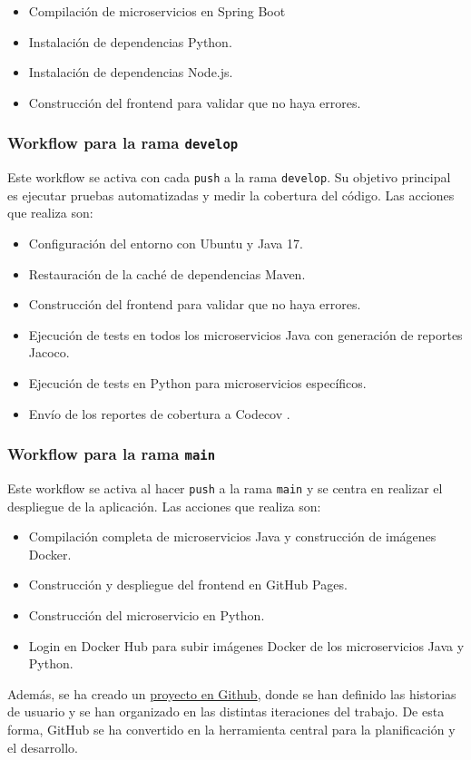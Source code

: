 \begin{itemize}
  \item Compilación de microservicios en Spring Boot
  \item Instalación de dependencias Python.
  \item Instalación de dependencias Node.js.
  \item Construcción del frontend para validar que no haya errores.
\end{itemize}
\subsubsection*{Workflow para la rama \texttt{develop}}

Este workflow se activa con cada \texttt{push} a la rama \texttt{develop}. Su objetivo principal es ejecutar pruebas automatizadas y medir la cobertura del código. Las acciones que realiza son: 

\begin{itemize}
  \item Configuración del entorno con Ubuntu y Java 17.
  \item Restauración de la caché de dependencias Maven.
  \item Construcción del frontend para validar que no haya errores.
  \item Ejecución de tests en todos los microservicios Java con generación de reportes Jacoco.
  \item Ejecución de tests en Python para microservicios específicos.
  \item Envío de los reportes de cobertura a Codecov \cite{codecov}.
\end{itemize}



\subsubsection*{Workflow para la rama \texttt{main}}

Este workflow se activa al hacer \texttt{push} a la rama \texttt{main} y se centra en realizar el despliegue de la aplicación. Las acciones que realiza son: 

\begin{itemize}
  \item Compilación completa de microservicios Java y construcción de imágenes Docker.
  \item Construcción y despliegue del frontend en GitHub Pages.
  \item Construcción del microservicio en Python.
  \item Login en Docker Hub para subir imágenes Docker de los microservicios Java y Python.
\end{itemize}
\vspace{0.5em}
Además, se ha creado un \href{https://github.com/users/alonsodm12/projects/5}{proyecto en Github}, donde se han definido las historias de usuario y se han organizado en las distintas iteraciones del trabajo. De esta forma, GitHub se ha convertido en la herramienta central para la planificación y el desarrollo.


